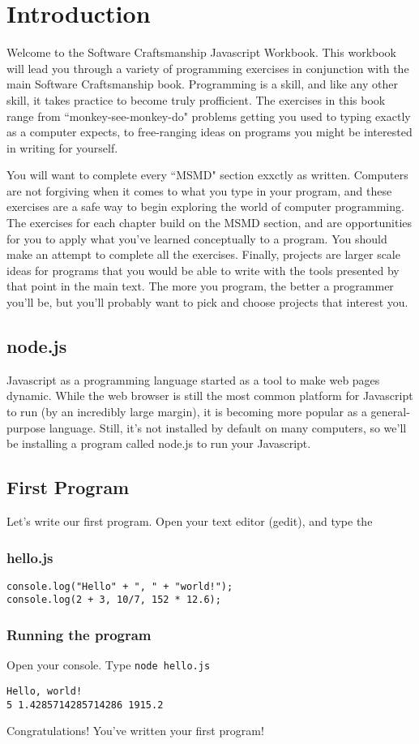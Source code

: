 \chapter{Introduction}
Welcome to the Software Craftsmanship Javascript Workbook. This workbook will
lead you through a variety of programming exercises in conjunction with the main
Software Craftsmanship book. Programming is a skill, and like any other skill,
it takes practice to become truly profficient. The exercises in this book range
from ``monkey-see-monkey-do" problems getting you used to typing exactly as a
computer expects, to free-ranging ideas on programs you might be interested in
writing for yourself. 

You will want to complete every ``MSMD" section exxctly as written. Computers
are not forgiving when it comes to what you type in your program, and these
exercises are a safe way to begin exploring the world of computer programming.
The exercises for each chapter build on the MSMD section, and are opportunities
for you to apply what you've learned conceptually to a program. You should make
an attempt to complete all the exercises. Finally, projects are larger scale
ideas for programs that you would be able to write with the tools presented by
that point in the main text. The more you program, the better a programmer
you'll be, but you'll probably want to pick and choose projects that interest
you.

\section{node.js}
Javascript as a programming language started as a tool to make web pages
dynamic. While the web browser is still the most common platform for Javascript
to run (by an incredibly large margin), it is becoming more popular as a
general-purpose language. Still, it's not installed by default on many
computers, so we'll be installing a program called node.js to run your
Javascript.

\section{First Program}
Let's write our first program. Open your text editor (gedit), and type the 

\subsection{hello.js}
\begin{lstlisting}
console.log("Hello" + ", " + "world!");
console.log(2 + 3, 10/7, 152 * 12.6);
\end{lstlisting}

\subsection{Running the program}
Open your console. Type {\tt node hello.js}

\begin{lstlisting}
Hello, world!
5 1.4285714285714286 1915.2
\end{lstlisting}

Congratulations! You've written your first program!
